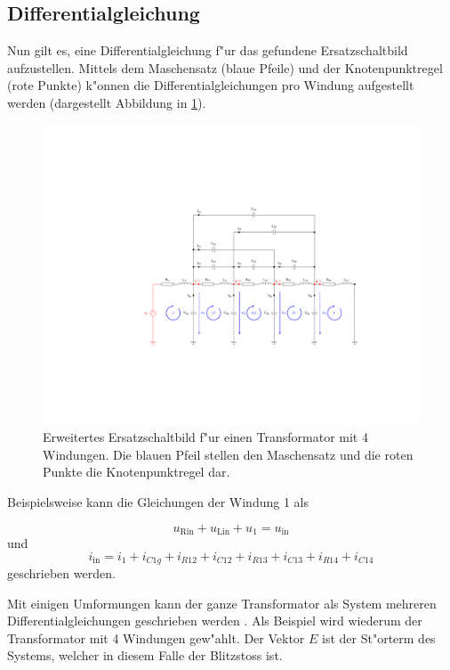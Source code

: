 \begin{refsection}
\subsection{Differentialgleichung}

Nun gilt es, eine Differentialgleichung f"ur das gefundene Ersatzschaltbild aufzustellen. Mittels dem Maschensatz (blaue Pfeile) und der Knotenpunktregel (rote Punkte) k"onnen die Differentialgleichungen pro Windung aufgestellt werden (dargestellt Abbildung in \ref{trafo:orig}).

\begin{figure}
	\centering
	\includegraphics[width=\hsize]{./trafo/images/orig_trafo.pdf}
	\caption[Erweitertes Ersatzschaltbild f"ur einen Transformator mit Maschensatz und Knotenpunkt]{Erweitertes Ersatzschaltbild f"ur einen Transformator mit 4 Windungen. Die blauen Pfeil stellen den Maschensatz und die roten Punkte die Knotenpunktregel dar.}
	\label{trafo:orig}
\end{figure}

Beispielsweise kann die Gleichungen der Windung 1 als 

\begin{equation}
	u_\mathrm{Rin} + u_\mathrm{Lin} + u_1 = u_\mathrm{in}
\end{equation}
und 
\begin{equation}
	i_\mathrm{in} = i_1 + i_{C1g} + i_{R12} + i_{C12} + i_{R13} + i_{C13} + i_{R14} + i_{C14}
\end{equation}
geschrieben werden. 

Mit einigen Umformungen kann der ganze Transformator als System mehreren Differentialgleichungen geschrieben werden \cite{trafo:SeminarCHR}. Als Beispiel wird wiederum der Transformator mit 4 Windungen gew"ahlt. Der Vektor $E$ ist der St"orterm des Systems, welcher in diesem Falle der Blitzstoss ist.


\end{refsection}

